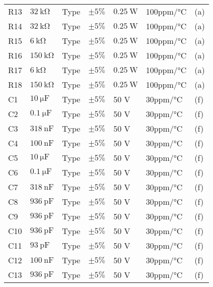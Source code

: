 \begin{table}[h!]
\begin{threeparttable}
\begin{tabular}{ l l l l l l l }
R13 & $\SI{32}{\kilo\ohm}$			& Type	& $\pm 5\%$ 		 & $\SI{0.25}{\watt}$	  & 100ppm/\si{\celsius}  & (a) \\
R14 & $\SI{32}{\kilo\ohm}$			& Type	& $\pm 5\%$ 		 & $\SI{0.25}{\watt}$	  & 100ppm/\si{\celsius}  & (a) \\
R15 & $\SI{6}{\kilo\ohm}$			& Type	& $\pm 5\%$ 		 & $\SI{0.25}{\watt}$	  & 100ppm/\si{\celsius}  & (a) \\
R16 & $\SI{150}{\kilo\ohm}$			& Type	& $\pm 5\%$ 		 & $\SI{0.25}{\watt}$	  & 100ppm/\si{\celsius}  & (a) \\
R17 & $\SI{6}{\kilo\ohm}$			& Type	& $\pm 5\%$ 		 & $\SI{0.25}{\watt}$	  & 100ppm/\si{\celsius}  & (a) \\
R18 & $\SI{150}{\kilo\ohm}$			& Type	& $\pm 5\%$ 		 & $\SI{0.25}{\watt}$	  & 100ppm/\si{\celsius}  & (a) \\
C1 & $\SI{10}{\micro\farad}$ & Type & $\pm 5\%$ & 50 \si{\volt} & 30ppm/\si{\celsius} & (f)\\
C2 & $\SI{0.1}{\micro\farad}$ & Type & $\pm 5\%$ & 50 \si{\volt} & 30ppm/\si{\celsius} & (f)\\
C3 & $\SI{318}{\nano\farad}$ & Type & $\pm 5\%$ & 50 \si{\volt} & 30ppm/\si{\celsius} & (f)\\
C4 & $\SI{100}{\nano\farad}$ & Type & $\pm 5\%$ & 50 \si{\volt} & 30ppm/\si{\celsius} & (f)\\
C5 & $\SI{10}{\micro\farad}$ & Type & $\pm 5\%$ & 50 \si{\volt} & 30ppm/\si{\celsius} & (f)\\
C6 & $\SI{0.1}{\micro\farad}$ & Type & $\pm 5\%$ & 50 \si{\volt} & 30ppm/\si{\celsius} & (f)\\
C7 & $\SI{318}{\nano\farad}$ & Type & $\pm 5\%$ & 50 \si{\volt} & 30ppm/\si{\celsius} & (f)\\
C8 & $\SI{936}{\pico\farad}$ & Type & $\pm 5\%$ & 50 \si{\volt} & 30ppm/\si{\celsius} & (f)\\
C9 & $\SI{936}{\pico\farad}$ & Type & $\pm 5\%$ & 50 \si{\volt} & 30ppm/\si{\celsius} & (f)\\
C10 & $\SI{936}{\pico\farad}$ & Type & $\pm 5\%$ & 50 \si{\volt} & 30ppm/\si{\celsius} & (f)\\
C11 & $\SI{93}{\pico\farad}$ & Type & $\pm 5\%$ & 50 \si{\volt} & 30ppm/\si{\celsius} & (f)\\
C12 & $\SI{100}{\nano\farad}$ & Type & $\pm 5\%$ & 50 \si{\volt} & 30ppm/\si{\celsius} & (f)\\
C13 & $\SI{936}{\pico\farad}$ & Type & $\pm 5\%$ & 50 \si{\volt} & 30ppm/\si{\celsius} & (f)\\

\end{tabular}
\end{threeparttable}
\end{table}
